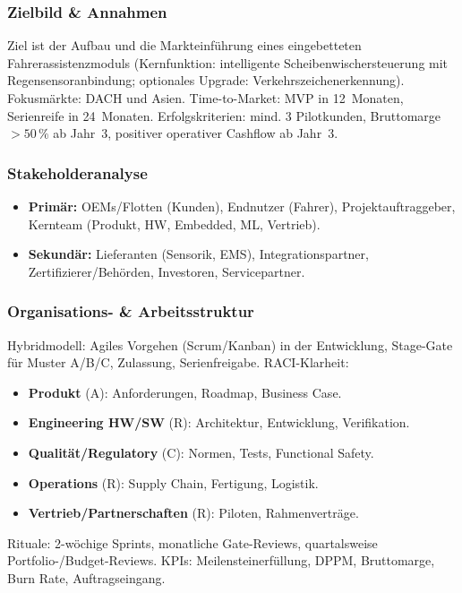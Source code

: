 \documentclass[
%
ngerman %
%
numeric %
]{wbh-assignment}
\begin{document}
\vspace*{5mm}

\subsubsection{Zielbild \& Annahmen}
Ziel ist der Aufbau und die Markteinführung eines eingebetteten Fahrerassistenzmoduls (Kernfunktion: intelligente Scheibenwischersteuerung mit Regensensoranbindung; optionales Upgrade: Verkehrszeichenerkennung). Fokusmärkte: DACH und Asien. Time-to-Market: MVP in 12~Monaten, Serienreife in 24~Monaten. Erfolgskriterien: mind. 3 Pilotkunden, Bruttomarge $>50\,\%$ ab Jahr~3, positiver operativer Cashflow ab Jahr~3.

\subsubsection{Stakeholderanalyse}
\begin{itemize}
  \item \textbf{Primär:} OEMs/Flotten (Kunden), Endnutzer (Fahrer), Projektauftraggeber, Kernteam (Produkt, HW, Embedded, ML, Vertrieb).
  \item \textbf{Sekundär:} Lieferanten (Sensorik, EMS), Integrationspartner, Zertifizierer/Behörden, Investoren, Servicepartner.
\end{itemize}

\subsubsection{Organisations- \& Arbeitsstruktur}
Hybridmodell: Agiles Vorgehen (Scrum/Kanban) in der Entwicklung, Stage-Gate für Muster A/B/C, Zulassung, Serienfreigabe. RACI-Klarheit:
\begin{itemize}
  \item \textbf{Produkt} (A): Anforderungen, Roadmap, Business Case.
  \item \textbf{Engineering HW/SW} (R): Architektur, Entwicklung, Verifikation.
  \item \textbf{Qualität/Regulatory} (C): Normen, Tests, Functional Safety.
  \item \textbf{Operations} (R): Supply Chain, Fertigung, Logistik.
  \item \textbf{Vertrieb/Partnerschaften} (R): Piloten, Rahmenverträge.
\end{itemize}
Rituale: 2-wöchige Sprints, monatliche Gate-Reviews, quartalsweise Portfolio-/Budget-Reviews. KPIs: Meilensteinerfüllung, DPPM, Bruttomarge, Burn Rate, Auftragseingang.
\end{document}
